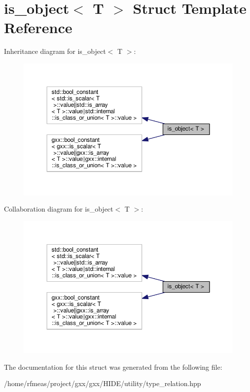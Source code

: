 \hypertarget{structis__object}{}\section{is\+\_\+object$<$ T $>$ Struct Template Reference}
\label{structis__object}


Inheritance diagram for is\+\_\+object$<$ T $>$\+:
\nopagebreak
\begin{figure}[H]
\begin{center}
\leavevmode
\includegraphics[width=350pt]{structis__object__inherit__graph}
\end{center}
\end{figure}


Collaboration diagram for is\+\_\+object$<$ T $>$\+:
\nopagebreak
\begin{figure}[H]
\begin{center}
\leavevmode
\includegraphics[width=350pt]{structis__object__coll__graph}
\end{center}
\end{figure}


The documentation for this struct was generated from the following file\+:\begin{DoxyCompactItemize}
\item 
/home/rfmeas/project/gxx/gxx/\+H\+I\+D\+E/utility/type\+\_\+relation.\+hpp\end{DoxyCompactItemize}
